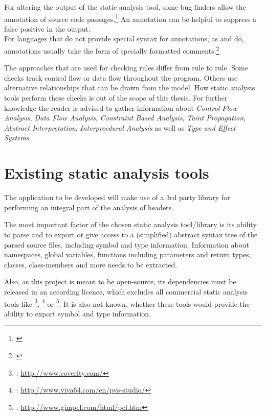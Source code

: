 For altering the output of the static analysis tool, some bug finders allow the annotation of source code passages.\footnote{\citep[99]{SecureProgramming}} An annotation can be helpful to suppress a false positive in the output.
\\For languages that do not provide special syntax for annotations, as  and  do, annotations usually
take the form of specially formatted comments.\footnote{\citep[99]{SecureProgramming}}

The approaches that are used for checking rules differ from rule to rule. Some checks track control flow or data flow throughout the program. Others use alternative relationships that can be drawn from the model. How static analysis tools perform these checks is out of the scope of this thesis. For further knowledge the reader is advised to gather information about \textit{Control Flow Analysis}, \textit{Data Flow Analysis}, \textit{Constraint Based Analysis}, \textit{Taint Propagation}, \textit{Abstract Interpretation}, \textit{Interprocdural Analysis }as well as \textit{Type and Effect Systems}. 

\section{Existing static analysis tools}

The application to be developed will make use of a 3rd party library for performing an integral part of the analysis of  headers. 

The most important factor of the chosen static analysis tool/library is its ability to parse  and to export or give access to a (simplified) abstract syntax tree of the parsed source files, including symbol and type information. Information about namespaces, global variables, functions including parameters and return types, classes, class-members and more needs to be extracted.

Also, as this project is meant to be open-source, its dependencies must be released in an according licence, which excludes all commercial static analysis tools like \footnote{: \url{http://www.coverity.com/}}, \footnote{: \url{http://www.viva64.com/en/pvs-studio/}} or \footnote{: \url{http://www.gimpel.com/html/pcl.htm}}. It is also not known, whether these tools would provide the ability to export symbol and type information.

